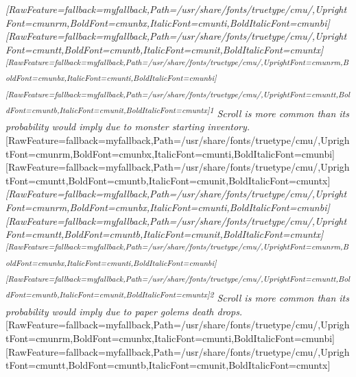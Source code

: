{\itshape \allowbreak{}\setmainfont{cmunrm.ttf}[RawFeature={fallback=myfallback},Path=/usr/share/fonts/truetype/cmu/,UprightFont=cmunrm,BoldFont=cmunbx,ItalicFont=cmunti,BoldItalicFont=cmunbi]\setmonofont{cmunrm.ttf}[RawFeature={fallback=myfallback},Path=/usr/share/fonts/truetype/cmu/,UprightFont=cmuntt,BoldFont=cmuntb,ItalicFont=cmunit,BoldItalicFont=cmuntx]\textsuperscript{\allowbreak{}\setmainfont{cmunti.ttf}[RawFeature={fallback=myfallback},Path=/usr/share/fonts/truetype/cmu/,UprightFont=cmunrm,BoldFont=cmunbx,ItalicFont=cmunti,BoldItalicFont=cmunbi]\setmonofont{cmunti.ttf}[RawFeature={fallback=myfallback},Path=/usr/share/fonts/truetype/cmu/,UprightFont=cmuntt,BoldFont=cmuntb,ItalicFont=cmunit,BoldItalicFont=cmuntx]\itshape 1} Scroll is more common than its probability would imply due to monster starting inventory\footnotemark[64].}$\text{ }$\newline{}
\allowbreak{}\setmainfont{cmunrm.ttf}[RawFeature={fallback=myfallback},Path=/usr/share/fonts/truetype/cmu/,UprightFont=cmunrm,BoldFont=cmunbx,ItalicFont=cmunti,BoldItalicFont=cmunbi]\setmonofont{cmunrm.ttf}[RawFeature={fallback=myfallback},Path=/usr/share/fonts/truetype/cmu/,UprightFont=cmuntt,BoldFont=cmuntb,ItalicFont=cmunit,BoldItalicFont=cmuntx]
{\itshape \allowbreak{}\setmainfont{cmunrm.ttf}[RawFeature={fallback=myfallback},Path=/usr/share/fonts/truetype/cmu/,UprightFont=cmunrm,BoldFont=cmunbx,ItalicFont=cmunti,BoldItalicFont=cmunbi]\setmonofont{cmunrm.ttf}[RawFeature={fallback=myfallback},Path=/usr/share/fonts/truetype/cmu/,UprightFont=cmuntt,BoldFont=cmuntb,ItalicFont=cmunit,BoldItalicFont=cmuntx]\textsuperscript{\allowbreak{}\setmainfont{cmunti.ttf}[RawFeature={fallback=myfallback},Path=/usr/share/fonts/truetype/cmu/,UprightFont=cmunrm,BoldFont=cmunbx,ItalicFont=cmunti,BoldItalicFont=cmunbi]\setmonofont{cmunti.ttf}[RawFeature={fallback=myfallback},Path=/usr/share/fonts/truetype/cmu/,UprightFont=cmuntt,BoldFont=cmuntb,ItalicFont=cmunit,BoldItalicFont=cmuntx]\itshape 2} Scroll is more common than its probability would imply due to paper golems\footnotemark[65]\textquotesingle{} death drops\footnotemark[66].}$\text{ }$\newline{}
\allowbreak{}\setmainfont{cmunrm.ttf}[RawFeature={fallback=myfallback},Path=/usr/share/fonts/truetype/cmu/,UprightFont=cmunrm,BoldFont=cmunbx,ItalicFont=cmunti,BoldItalicFont=cmunbi]\setmonofont{cmunrm.ttf}[RawFeature={fallback=myfallback},Path=/usr/share/fonts/truetype/cmu/,UprightFont=cmuntt,BoldFont=cmuntb,ItalicFont=cmunit,BoldItalicFont=cmuntx]
